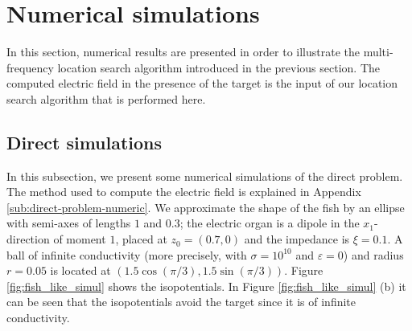 \documentclass[final]{siamltex}
\numberwithin{equation}{section}
\numberwithin{figure}{section}
\numberwithin{table}{section}
\begin{document}


\section{Numerical simulations}

\label{sec:numeric}

In this section, numerical results are presented in order to
illustrate the multi-frequency location search algorithm
introduced in the previous section. The computed electric field in
the presence of the target is the input of our location search
algorithm that is performed here.

\subsection{Direct simulations}

In this subsection, we present some numerical simulations of the
direct problem. The method used to compute the electric field is
explained in Appendix \ref{sub:direct-problem-numeric}. We
approximate the shape of the fish by an ellipse with semi-axes of
lengths $1$ and $0.3$; the electric organ is a dipole in the
$x_1$-direction of moment $1$, placed at $z_{0}=(0.7,0)$ and the
impedance is $\xi=0.1$. A ball of infinite conductivity (more
precisely, with $\sigma=10^{10}$ and $\varepsilon=0$) and radius
$r=0.05$ is located at $(1.5\cos(\pi/3),1.5\sin(\pi/3))$. Figure
\ref{fig:fish_like_simul} shows the isopotentials. In Figure
\ref{fig:fish_like_simul} (b) it can be seen that the
isopotentials avoid the target since it is of infinite
conductivity.

\end{document}
